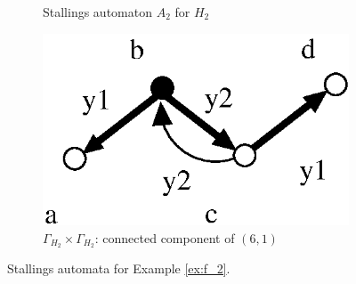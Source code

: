 \documentclass[a4paper,12pt]{article}
\newcommand{\G}{\Gamma }
\numberwithin{equation}{section}
\numberwithin{figure}{section}
\begin{document}
\begin{figure}
\begin{center}
\begin{subfigure}[b]{.3\columnwidth}
\caption{Stallings automaton $A_2$ for $H_2$}
\label{fig:stallh2}
\end{subfigure}
\hspace{25mm}
\begin{subfigure}[b]{.3\columnwidth}
\includegraphics[scale=.52]{G2xG2-1.eps}
\caption{$\G_{H_2}\times \G_{H_2}$: connected component of $(6,1)$}
\label{fig:G2xG2-1}
\end{subfigure}
\end{center}
\caption{Stallings automata for Example \ref{ex:f_2}.}\label{fig:stallagain}
\end{figure}
\end{document}
